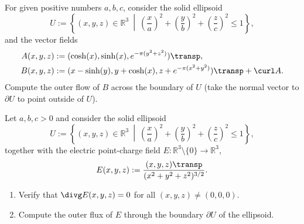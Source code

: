\begin{exercise}
\label{ex:examHS24_KP1_part2_flux}
For given positive numbers $a, b, c$, consider the solid ellipsoid
\[ U := \left\{(x,y,z) \in \mathbb{R}^3 \ \middle|\ \left(\frac{x}{a}\right)^2 + \left(\frac{y}{b}\right)^2 + \left(\frac{z}{c}\right)^2 \le 1\right\}, \]
and the vector fields
\begin{align*}
  A(x,y,z) &:= (\cosh(x), \sinh(x), e^{-\pi(y^2+z^2)})\transp, \\
  B(x,y,z) &:= (x - \sinh(y), y + \cosh(x), z + e^{-\pi(x^2+y^2)})\transp + \curl A.
\end{align*}
Compute the outer flow of $B$ across the boundary of $U$ (take the normal vector to $\partial U$ to point outside of $U$).
\end{exercise}

\begin{exercise}
\label{ex:gauss_law_ellipsoid_flux}
Let $a,b,c > 0$ and consider the solid ellipsoid
\[U := \left\{(x,y,z) \in \mathbb{R}^3 \ \middle|\ \left(\frac{x}{a}\right)^2 + \left(\frac{y}{b}\right)^2 + \left(\frac{z}{c}\right)^2 \leq 1\right\},\]
together with the electric point-charge field $E : \mathbb{R}^3 \setminus \{0\} \to \mathbb{R}^3$,
\[E(x,y,z) := \frac{(x,y,z)\transp}{(x^2+y^2+z^2)^{3/2}}.\]
\begin{enumerate}[label=\textbf{(\alph*)}]
  \item Verify that $\divg E(x,y,z) = 0$ for all $(x,y,z) \neq (0,0,0)$.
  \item Compute the outer flux of $E$ through the boundary $\partial U$ of the ellipsoid.
\end{enumerate}
\end{exercise}

